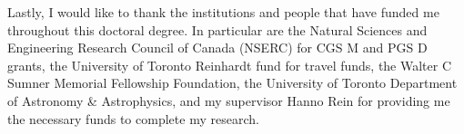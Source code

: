 \documentclass[letterpaper]{ut-thesis} %
\begin{document}
\begin{preliminary}
\begin{acknowledgements}
Lastly, I would like to thank the institutions and people that have funded me throughout this doctoral degree. 
In particular are the Natural Sciences and Engineering Research Council of Canada (NSERC) for CGS M and PGS D grants, the University of Toronto Reinhardt fund for travel funds, the Walter C Sumner Memorial Fellowship Foundation, the University of Toronto Department of Astronomy \& Astrophysics, and my supervisor Hanno Rein for providing me the necessary funds to complete my research. 

\end{acknowledgements}

\tableofcontents

\listoftables

\listoffigures

\end{preliminary}















\end{document}
